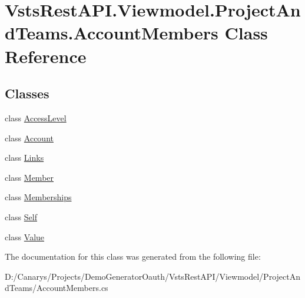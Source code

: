 \hypertarget{class_vsts_rest_a_p_i_1_1_viewmodel_1_1_project_and_teams_1_1_account_members}{}\section{Vsts\+Rest\+A\+P\+I.\+Viewmodel.\+Project\+And\+Teams.\+Account\+Members Class Reference}
\label{class_vsts_rest_a_p_i_1_1_viewmodel_1_1_project_and_teams_1_1_account_members}
\subsection*{Classes}
\begin{DoxyCompactItemize}
\item 
class \mbox{\hyperlink{class_vsts_rest_a_p_i_1_1_viewmodel_1_1_project_and_teams_1_1_account_members_1_1_access_level}{Access\+Level}}
\item 
class \mbox{\hyperlink{class_vsts_rest_a_p_i_1_1_viewmodel_1_1_project_and_teams_1_1_account_members_1_1_account}{Account}}
\item 
class \mbox{\hyperlink{class_vsts_rest_a_p_i_1_1_viewmodel_1_1_project_and_teams_1_1_account_members_1_1_links}{Links}}
\item 
class \mbox{\hyperlink{class_vsts_rest_a_p_i_1_1_viewmodel_1_1_project_and_teams_1_1_account_members_1_1_member}{Member}}
\item 
class \mbox{\hyperlink{class_vsts_rest_a_p_i_1_1_viewmodel_1_1_project_and_teams_1_1_account_members_1_1_memberships}{Memberships}}
\item 
class \mbox{\hyperlink{class_vsts_rest_a_p_i_1_1_viewmodel_1_1_project_and_teams_1_1_account_members_1_1_self}{Self}}
\item 
class \mbox{\hyperlink{class_vsts_rest_a_p_i_1_1_viewmodel_1_1_project_and_teams_1_1_account_members_1_1_value}{Value}}
\end{DoxyCompactItemize}


The documentation for this class was generated from the following file\+:\begin{DoxyCompactItemize}
\item 
D\+:/\+Canarys/\+Projects/\+Demo\+Generator\+Oauth/\+Vsts\+Rest\+A\+P\+I/\+Viewmodel/\+Project\+And\+Teams/Account\+Members.\+cs\end{DoxyCompactItemize}
